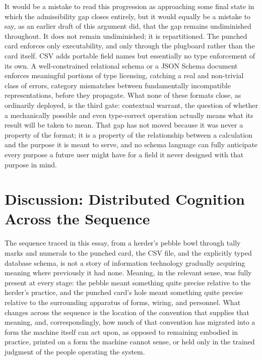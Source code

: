 \documentclass[11pt]{article}
\begin{document}
It would be a mistake to read this progression as approaching some final state in which the admissibility gap closes entirely, but it would equally be a mistake to say, as an earlier draft of this argument did, that the gap remains undiminished throughout. It does not remain undiminished; it is repartitioned. The punched card enforces only executability, and only through the plugboard rather than the card itself. CSV adds portable field names but essentially no type enforcement of its own. A well-constrained relational schema or a JSON Schema document enforces meaningful portions of type licensing, catching a real and non-trivial class of errors, category mismatches between fundamentally incompatible representations, before they propagate. What none of these formats close, as ordinarily deployed, is the third gate: contextual warrant, the question of whether a mechanically possible and even type-correct operation actually means what its result will be taken to mean. That gap has not moved because it was never a property of the format; it is a property of the relationship between a calculation and the purpose it is meant to serve, and no schema language can fully anticipate every purpose a future user might have for a field it never designed with that purpose in mind.

\section{Discussion: Distributed Cognition Across the Sequence}

The sequence traced in this essay, from a herder's pebble bowl through tally marks and numerals to the punched card, the CSV file, and the explicitly typed database schema, is not a story of information technology gradually acquiring meaning where previously it had none. Meaning, in the relevant sense, was fully present at every stage: the pebble meant something quite precise relative to the herder's practice, and the punched card's hole meant something quite precise relative to the surrounding apparatus of forms, wiring, and personnel. What changes across the sequence is the location of the convention that supplies that meaning, and, correspondingly, how much of that convention has migrated into a form the machine itself can act upon, as opposed to remaining embodied in practice, printed on a form the machine cannot sense, or held only in the trained judgment of the people operating the system.
\end{document}
